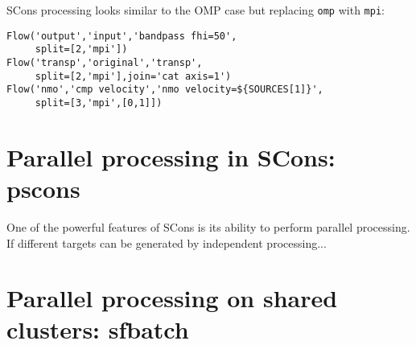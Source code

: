 SCons processing looks similar to the OMP case but replacing \texttt{omp} with \texttt{mpi}:
\lstset{language=python,showstringspaces=false,frame=single}
\begin{lstlisting}
Flow('output','input','bandpass fhi=50',
     split=[2,'mpi'])
Flow('transp','original','transp',
     split=[2,'mpi'],join='cat axis=1')
Flow('nmo','cmp velocity','nmo velocity=${SOURCES[1]}',
     split=[3,'mpi',[0,1]])
\end{lstlisting}


\section{Parallel processing in SCons: pscons}

One of the powerful features of SCons is its ability to perform
parallel processing. If different targets can be generated by
independent processing...

\section{Parallel processing on shared clusters: sfbatch}




